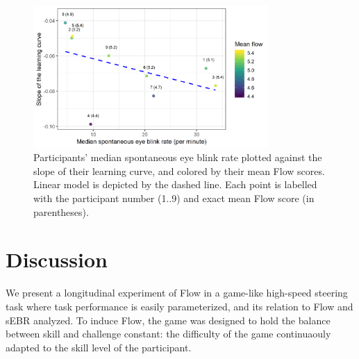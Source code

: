\documentclass[fleqn,10pt]{wlscirep}
\newcommand{\nicewidth}{0.8\textwidth}
\begin{document}





\begin{figure}[!ht]
	\centering
	\includegraphics[width=\nicewidth]{lcurve_sbr_flowRL2}
	\caption{Participants' median spontaneous eye blink rate plotted against the slope of their learning curve, and colored by their mean Flow scores. Linear model is depicted by the dashed line. Each point is labelled with the participant number (1..9) and exact mean Flow score (in parentheses).}
	\label{fig:EBRvLC}
\end{figure}


\section*{Discussion}
We present a longitudinal experiment of Flow in a game-like high-speed steering task where task performance is easily parameterized, and its relation to Flow and sEBR analyzed. %
To induce Flow, the game was designed to hold the balance between skill and challenge constant: the difficulty of the game continuaouly adapted to the skill level of the participant.
\end{document}
